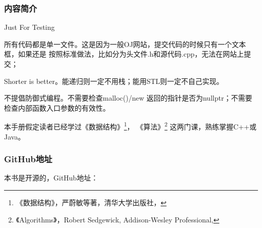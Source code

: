 \subsubsection{内容简介}
Just For Testing

\begindot
\item 所有代码都是单一文件。这是因为一般OJ网站，提交代码的时候只有一个文本框，如果还是
按照标准做法，比如分为头文件.h和源代码.cpp，无法在网站上提交；

\item Shorter is better。能递归则一定不用栈；能用STL则一定不自己实现。

\item 不提倡防御式编程。不需要检查malloc()/new 返回的指针是否为nullptr；不需要检查内部函数入口参数的有效性。
\myenddot

本手册假定读者已经学过《数据结构》\footnote{《数据结构》，严蔚敏等著，清华大学出版社，
}，
《算法》\footnote{《Algorithms》，Robert Sedgewick, Addison-Wesley Professional, }
这两门课，熟练掌握C++或Java。

\subsubsection{GitHub地址}
本书是开源的，GitHub地址：
